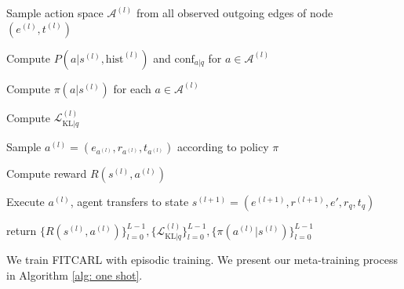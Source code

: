 \documentclass[runningheads]{llncs}
\begin{document}
\begin{algorithm}[t]
{%


}

{
{
Sample action space $\mathcal{A}^{(l)}$ from all observed outgoing edges of node $(e^{(l)}, t^{(l)})$

Compute $P(a|s^{(l)}, \text{hist}^{(l)})$ and $\text{conf}_{a|q}$ for $a \in \mathcal{A}^{(l)}$ 

Compute $\pi(a|s^{(l)})$ for each $a \in \mathcal{A}^{(l)}$ 

Compute $\mathcal{L}_{\text{KL}|q}^{(l)}$ 

Sample $a^{(l)} = (e_{a^{(l)}}, r_{a^{(l)}}, t_{a^{(l)}})$ according to policy $\pi$

Compute reward $R(s^{(l)}, a^{(l)})$

Execute $a^{(l)}$, agent transfers to state $s^{(l+1)} = (e^{(l+1)}, r^{(l+1)}, e', r_q, t_q)$

}
return $\{R(s^{(l)}, a^{(l)})\}_{l=0}^{L-1}, \{\mathcal{L}_{\text{KL}|q}^{(l)}\}_{l=0}^{L-1}, \{\pi(a^{(l)}|s^{(l)})\}_{l=0}^{L-1}$\;
}
\end{algorithm}
We train FITCARL with episodic training. We present our meta-training process in Algorithm \ref{alg: one shot}.
\end{document}
